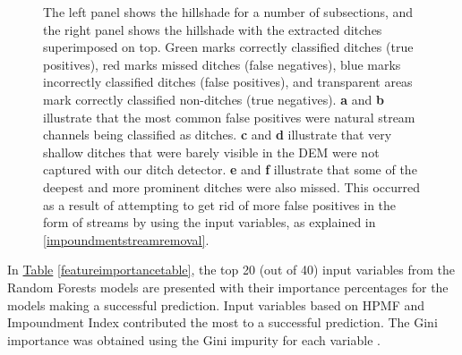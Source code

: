 \documentclass[]{interact}
\theoremstyle{plain}%
\theoremstyle{definition}
\theoremstyle{remark}
\begin{document}
\begin{figure} [!htb]
    \caption{The left panel shows the hillshade for a number of subsections, and the right panel shows the hillshade with the extracted ditches superimposed on top. Green marks correctly classified ditches (true positives), red marks missed ditches (false negatives), blue marks incorrectly classified ditches (false positives), and transparent areas mark correctly classified non-ditches (true negatives). \textbf{a} and \textbf{b} illustrate that the most common false positives were natural stream channels being classified as ditches. \textbf{c} and \textbf{d} illustrate that very shallow ditches that were barely visible in the DEM were not captured with our ditch detector. \textbf{e} and \textbf{f} illustrate that some of the deepest and more prominent ditches were also missed. This occurred as a result of attempting to get rid of more false positives in the form of streams by using the input variables, as explained in \ref{impoundmentstreamremoval}.}
    \label{fig:resultsillustrations}
\end{figure}
\clearpage

In \hyperref[featureimportancetable]{Table} \ref{featureimportancetable}, the top 20 (out of 40) input variables from the Random Forests models are presented with their importance percentages for the models making a successful prediction. Input variables based on HPMF and Impoundment Index contributed the most to a successful prediction. The Gini importance was obtained using the Gini impurity for each variable \citep{gini}.
\end{document}
